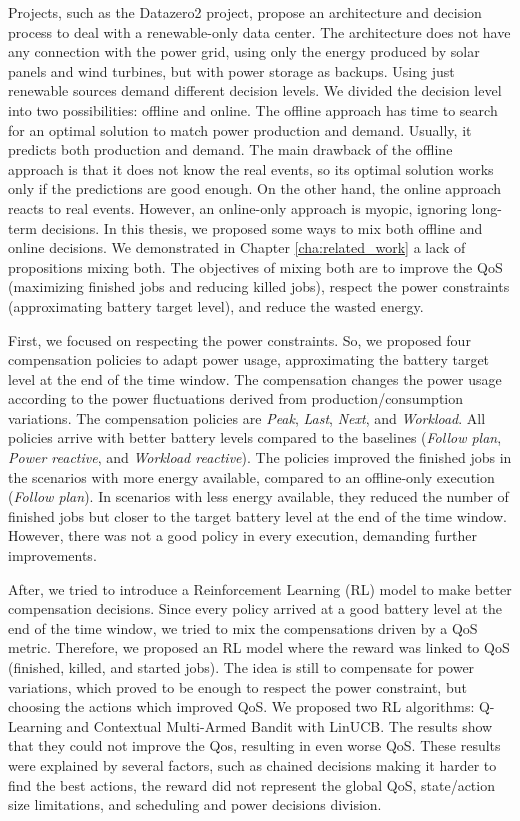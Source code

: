 Projects, such as the Datazero2 project, propose an architecture and decision process to deal with a renewable-only data center. The architecture does not have any connection with the power grid, using only the energy produced by solar panels and wind turbines, but with power storage as backups. Using just renewable sources demand different decision levels. We divided the decision level into two possibilities: offline and online. The offline approach has time to search for an optimal solution to match power production and demand. Usually, it predicts both production and demand. The main drawback of the offline approach is that it does not know the real events, so its optimal solution works only if the predictions are good enough. On the other hand, the online approach reacts to real events. However, an online-only approach is myopic, ignoring long-term decisions. In this thesis, we proposed some ways to mix both offline and online decisions. We demonstrated in Chapter \ref{cha:related_work} a lack of propositions mixing both. The objectives of mixing both are to improve the QoS (maximizing finished jobs and reducing killed jobs), respect the power constraints (approximating battery target level), and reduce the wasted energy.

First, we focused on respecting the power constraints. So, we proposed four compensation policies to adapt power usage, approximating the battery target level at the end of the time window. The compensation changes the power usage according to the power fluctuations derived from production/consumption variations. The compensation policies are \emph{Peak}, \emph{Last}, \emph{Next}, and \emph{Workload}. All policies arrive with better battery levels compared to the baselines (\emph{Follow plan}, \emph{Power reactive}, and \emph{Workload reactive}). The policies improved the finished jobs in the scenarios with more energy available, compared to an offline-only execution (\emph{Follow plan}). In scenarios with less energy available, they reduced the number of finished jobs but closer to the target battery level at the end of the time window. However, there was not a good policy in every execution, demanding further improvements.

After, we tried to introduce a Reinforcement Learning (RL) model to make better compensation decisions. Since every policy arrived at a good battery level at the end of the time window, we tried to mix the compensations driven by a QoS metric. Therefore, we proposed an RL model where the reward was linked to QoS (finished, killed, and started jobs). The idea is still to compensate for power variations, which proved to be enough to respect the power constraint, but choosing the actions which improved QoS. We proposed two RL algorithms: Q-Learning and Contextual Multi-Armed Bandit with LinUCB. The results show that they could not improve the Qos, resulting in even worse QoS. These results were explained by several factors, such as chained decisions making it harder to find the best actions, the reward did not represent the global QoS, state/action size limitations, and scheduling and power decisions division.


